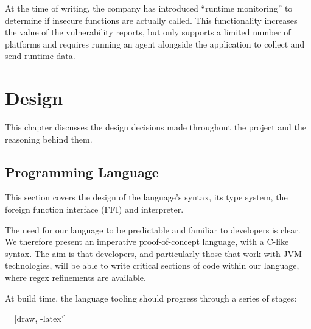 \documentclass[a4paper,openany,12pt]{book}
\begin{document}
At the time of writing, the company has introduced ``runtime monitoring'' to determine if insecure functions are
actually called.
This functionality increases the value of the vulnerability reports, but only supports a limited number of platforms and
requires running an agent alongside the application to collect and send runtime data.

\chapter{Design}\label{ch:design}

This chapter discusses the design decisions made throughout the project and the reasoning behind them.

\section{Programming Language}
This section covers the design of the language's syntax, its type system, the foreign function interface (FFI) and
interpreter.

The need for our language to be predictable and familiar to developers is clear.
We therefore present an imperative proof-of-concept language, with a C-like syntax.
The aim is that developers, and particularly those that work with JVM technologies, will be able to write critical
sections of code within our language, where regex refinements are available.

At build time, the language tooling should progress through a series of stages:

 = [draw, -latex']

\end{document}
